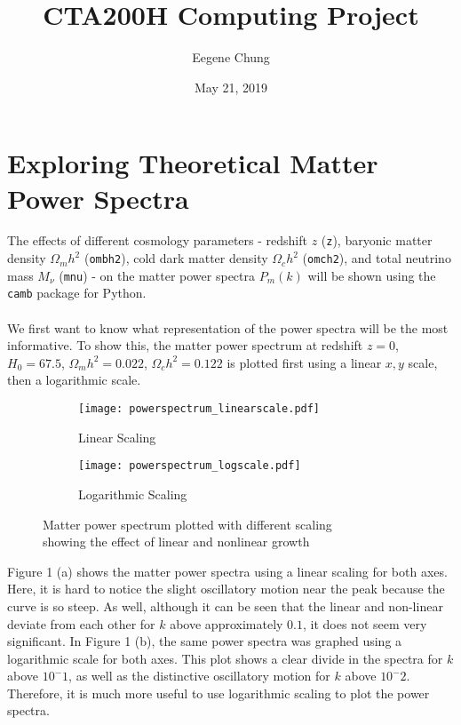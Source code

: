 \documentclass[11pt, letterpaper, twoside]{article}
\title{CTA200H Computing Project}
\author{Eegene Chung}
\date{May 21, 2019}
\begin{document}
\maketitle

\section{Exploring Theoretical Matter Power Spectra}

The effects of different cosmology parameters - redshift $z$ (\verb|z|), baryonic matter density $\Omega_m h^2$ (\verb|ombh2|), cold dark matter density $\Omega_c h^2$ (\verb|omch2|), and total neutrino mass $M_\nu$ (\verb|mnu|) - on the matter power spectra $P_m(k)$ will be shown using the \verb|camb| package for Python.\\\\

We first want to know what representation of the power spectra will be the most informative. To show this, the matter power spectrum at redshift $z = 0$, $H_0 = 67.5$, $\Omega_m h^2 = 0.022$, $\Omega_c h^2 = 0.122$ is plotted first using a linear $x, y$ scale, then a logarithmic scale.

\begin{figure}[h!]
    \centering
    \begin{subfigure}[b]{0.47\textwidth}
        \texttt{[image: powerspectrum\_linearscale.pdf]}
        \caption{Linear Scaling}
    \end{subfigure}
    \begin{subfigure}[b]{0.47\textwidth}
        \texttt{[image: powerspectrum\_logscale.pdf]}
        \caption{Logarithmic Scaling}
    \end{subfigure}
    \caption{Matter power spectrum plotted with different scaling\\ showing the effect of linear and nonlinear growth}
    \label{fig:log_lin_scale}
\end{figure}

Figure 1 (a) shows the matter power spectra using a linear scaling for both axes. Here, it is hard to notice the slight oscillatory motion near the peak because the curve is so steep. As well, although it can be seen that the linear and non-linear deviate from each other for $k$ above approximately $0.1$, it does not seem very significant. In Figure 1 (b), the same power spectra was graphed using a logarithmic scale for both axes. This plot shows a clear divide in the spectra for $k$ above $10^-1$, as well as the distinctive oscillatory motion for $k$ above $10^-2$. Therefore, it is much more useful to use logarithmic scaling to plot the power spectra.\\\\
\newpage
\end{document}
